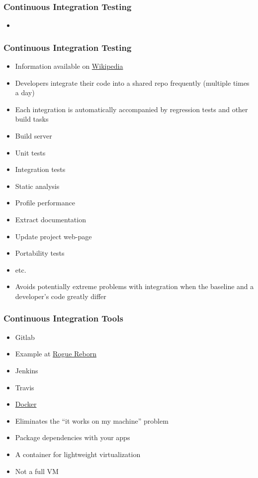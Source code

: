 \documentclass[t,12pt,numbers,fleqn]{beamer}
\begin{document}

\begin{frame}
\frametitle{Continuous Integration Testing}
\begin{itemize}
\item {}
\end{itemize}
\end{frame}


\begin{frame}
\frametitle{Continuous Integration Testing}
\begin{itemize}
\item Information available on
  \href{https://en.wikipedia.org/wiki/Continuous_integration}{Wikipedia}
\item Developers integrate their code into a shared repo frequently (multiple
  times a day)
\item Each integration is automatically accompanied by regression tests and
  other build tasks
\item Build server
\bi
\item Unit tests
\item Integration tests
\item Static analysis
\item Profile performance
\item Extract documentation
\item Update project web-page
\item Portability tests
\item etc.
\ei
\item Avoids potentially extreme problems with integration when the baseline and
  a developer's code greatly differ
\end{itemize}
\end{frame}


\begin{frame}
\frametitle{Continuous Integration Tools}
\begin{itemize}
\item Gitlab
\bi
\item Example at
  \href{https://gitlab.cas.mcmaster.ca/andrem5/RogueReborn/pipelines}{Rogue
    Reborn}
\ei
\item Jenkins
\item Travis
\item \href{https://www.docker.com/}{Docker}
\bi
\item Eliminates the ``it works on my machine'' problem
\item Package dependencies with your apps
\item A container for lightweight virtualization
\item Not a full VM
\ei
\end{itemize}
\end{frame}
\end{document}
